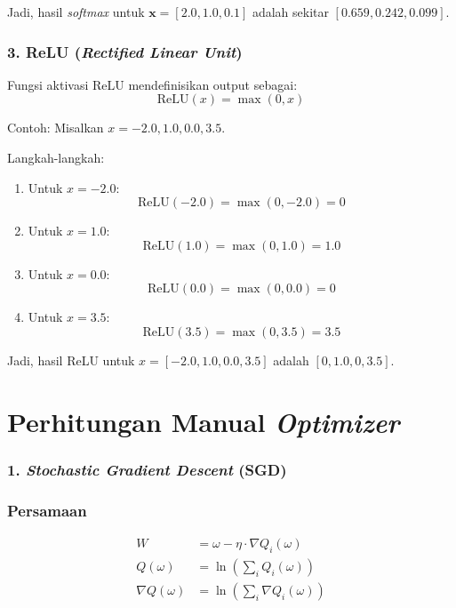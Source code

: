 Jadi, hasil \textit{softmax} untuk \(\mathbf{x} = [2.0, 1.0, 0.1]\) adalah sekitar \([0.659, 0.242, 0.099]\).

\subsection*{3. ReLU (\textit{Rectified Linear Unit})}
Fungsi aktivasi ReLU mendefinisikan output sebagai:
\[
\text{ReLU}(x) = \max(0, x)
\]

Contoh: Misalkan \( x = -2.0, 1.0, 0.0, 3.5 \).

Langkah-langkah:
\begin{enumerate}
    \item Untuk \( x = -2.0 \):
    \[
    \text{ReLU}(-2.0) = \max(0, -2.0) = 0
    \]

    \item Untuk \( x = 1.0 \):
    \[
    \text{ReLU}(1.0) = \max(0, 1.0) = 1.0
    \]

    \item Untuk \( x = 0.0 \):
    \[
    \text{ReLU}(0.0) = \max(0, 0.0) = 0
    \]

    \item Untuk \( x = 3.5 \):
    \[
    \text{ReLU}(3.5) = \max(0, 3.5) = 3.5
    \]
\end{enumerate}

Jadi, hasil ReLU untuk \( x = [-2.0, 1.0, 0.0, 3.5] \) adalah \([0, 1.0, 0, 3.5]\).



\chapter{Perhitungan Manual \textit{Optimizer}}
\subsection*{1. \textit{Stochastic Gradient Descent} (SGD)}

\subsection*{Persamaan}
\begin{align}
    W & = \omega - \eta \cdot \nabla Q_i(\omega) \\
    Q(\omega) & = \ln\left(\sum_i Q_i(\omega)\right) \\
    \nabla Q(\omega) & = \ln\left(\sum_i \nabla Q_i(\omega)\right)
\end{align}



